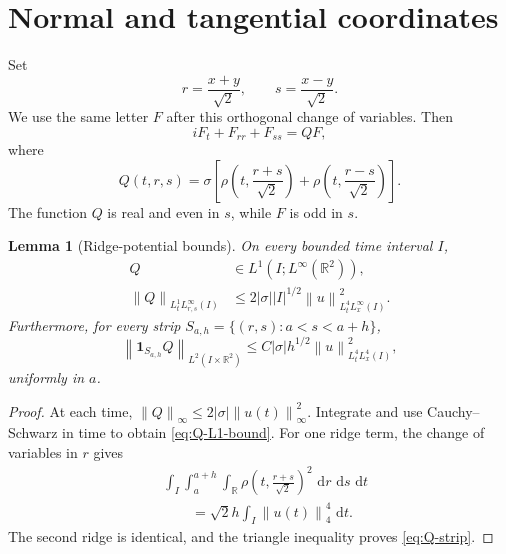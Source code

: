\documentclass[11pt,oneside]{book}
\newtheorem{lemma}[theorem]{Lemma}
\theoremstyle{definition}
\theoremstyle{remark}
\newcommand{\R}{\mathbb R}
\newcommand{\1}{\mathbf 1}
\newcommand{\dd}{\,\mathrm d}
\newcommand{\norm}[1]{\left\lVert #1\right\rVert}
\begin{document}
\section{Normal and tangential coordinates}
Set
\begin{equation}
 r=\frac{x+y}{\sqrt2},\qquad s=\frac{x-y}{\sqrt2}. \label{eq:rs-coordinates}
\end{equation}
We use the same letter $F$ after this orthogonal change of variables.  Then
\begin{equation}
 iF_t+F_{rr}+F_{ss}=QF,                             \label{eq:F-rs}
\end{equation}
where
\begin{equation}
 Q(t,r,s)=\sigma\left[
  \rho\!\left(t,\frac{r+s}{\sqrt2}\right)
 +\rho\!\left(t,\frac{r-s}{\sqrt2}\right)
 \right].                                          \label{eq:Q-ridge}
\end{equation}
The function $Q$ is real and even in $s$, while $F$ is odd in $s$.

\begin{lemma}[Ridge-potential bounds]\label{lem:Q-bounds}
On every bounded time interval $I$,
\begin{align}
 Q&\in L^1(I;L^\infty(\R^2)),                      \label{eq:Q-L1Linfty}\\
 \norm Q_{L^1_tL^\infty_{r,s}(I)}
 &\le2|\sigma||I|^{1/2}\norm u_{L^4_tL^\infty_x(I)}^2. \label{eq:Q-L1-bound}
\end{align}
Furthermore, for every strip
$S_{a,h}=\{(r,s):a<s<a+h\}$,
\begin{equation}
 \norm{\1_{S_{a,h}}Q}_{L^2(I\times\R^2)}
 \le C|\sigma|h^{1/2}\norm u_{L^4_tL^4_x(I)}^2,   \label{eq:Q-strip}
\end{equation}
uniformly in $a$.
\end{lemma}

\begin{proof}
At each time,
$\norm Q_\infty\le2|\sigma|\norm{u(t)}_\infty^2$.
Integrate and use Cauchy--Schwarz in time to obtain
\eqref{eq:Q-L1-bound}.  For one ridge term, the change of variables in $r$
gives
\begin{align*}
 &\int_I\int_a^{a+h}\int_\R
 \rho\!\left(t,\frac{r+s}{\sqrt2}\right)^2
 \,\dd r\,\dd s\,\dd t\\
 &\qquad=\sqrt2h\int_I\norm{u(t)}_4^4\,\dd t.
\end{align*}
The second ridge is identical, and the triangle inequality proves
\eqref{eq:Q-strip}.
\end{proof}
\end{document}
